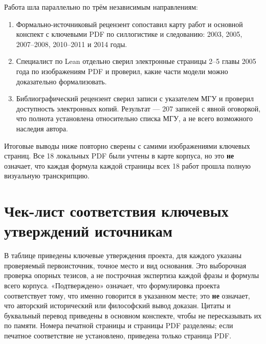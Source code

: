 \documentclass[12pt,a4paper]{article}
\begin{document}
Работа шла параллельно по трём независимым направлениям:

\begin{enumerate}
\item Формально-источниковый рецензент сопоставил карту работ и основной конспект с ключевыми PDF по силлогистике и следованию: 2003, 2005, 2007–2008, 2010–2011 и 2014 годы.
\item Специалист по Lean отдельно сверил электронные страницы 2–5 главы 2005 года по изображениям PDF и проверил, какие части модели можно доказательно формализовать.
\item Библиографический рецензент сверил записи с указателем МГУ и проверил доступность электронных копий. Результат — 207 записей с явной оговоркой, что полнота установлена относительно списка МГУ, а не всего возможного наследия автора.
\end{enumerate}
Итоговые выводы ниже повторно сверены с самими изображениями ключевых страниц. Все 18 локальных PDF были учтены в карте корпуса, но это \textbf{не} означает, что каждая формула каждой страницы всех 18 работ прошла полную визуальную транскрипцию.

\section{Чек-лист соответствия ключевых утверждений источникам}

В таблице приведены ключевые утверждения проекта, для каждого указаны проверяемый первоисточник, точное место и вид основания. Это выборочная проверка опорных тезисов, а не построчная экспертиза каждой фразы и формулы всего корпуса. «Подтверждено» означает, что формулировка проекта соответствует тому, что именно говорится в указанном месте; это \textbf{не} означает, что авторский исторический или философский вывод доказан. Цитаты и буквальный перевод приведены в основном конспекте, чтобы не пересказывать их по памяти. Номера печатной страницы и страницы PDF разделены; если печатное соответствие не установлено, приведена только страница PDF.
\end{document}
